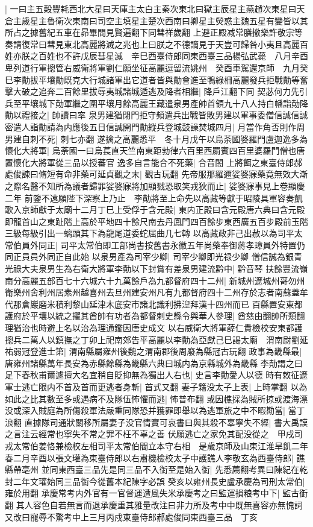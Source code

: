 |{
	一曰主五糓豐耗西北大星曰天庫主太白主秦次東北曰獄主辰星主燕趙次東星曰天倉主歲星主魯衛次東南曰司空主填星主楚次西南曰卿星主熒惑主魏五星有變皆以其所占之據舊紀五車在昴畢間見賢遍翻下同彗祥歲翻}
上避正殿减常膳撤樂許敬宗等奏請復常曰彗見東北高麗將滅之兆也上曰朕之不德謫見于天豈可歸咎小夷且高麗百姓亦朕之百姓也不許戊辰彗星滅　辛巳西臺侍郎同東西臺三品楊弘武薨　八月辛酉卑列道行軍摠管右威衛將軍劉仁願坐征高麗逗留流姚州　癸酉車駕還京師　九月癸巳李勣拔平壤勣既克大行城諸軍出它道者皆與勣會進至鴨綠柵高麗發兵拒戰勣等奮擊大破之追奔二百餘里拔辱夷城諸城遁逃及降者相繼|{
	降戶江翻下同}
契苾何力先引兵至平壤城下勣軍繼之圍平壤月餘高麗王藏遣泉男產帥首領九十八人持白幡詣勣降勣以禮接之|{
	帥讀曰率}
泉男建猶閉門拒守頻遣兵出戰皆敗男建以軍事委僧信誠信誠密遣人詣勣請為内應後五日信誠開門勣縱兵登城鼓譟焚城四月|{
	月當作角否則作周}
男建自刺不死|{
	刺七亦翻}
遂擒之高麗悉平　冬十月戊午以烏荼國婆羅門盧迦逸多為懷化大將軍|{
	烏荼國一曰烏萇直天竺南東距勃律六百里西罽賓四百里婆羅門僧也唐置懷化大將軍從三品以授蕃官}
逸多自言能合不死藥|{
	合音閤}
上將餌之東臺侍郎郝處俊諫曰脩短有命非藥可延貞觀之末|{
	觀古玩翻}
先帝服那羅邇娑婆寐藥竟無效大漸之際名醫不知所為議者歸罪娑婆寐將加顯戮恐取笑戎狄而止|{
	娑婆寐事見上卷顯慶二年}
前鑒不遠願陛下深察上乃止　李勣將至上命先以高藏等獻于昭陵具軍容奏凱歌入京師獻于太廟十二月丁巳上受俘于含元殿|{
	東内正殿曰含元殿唐六典曰含元殿即龍首山之東趾階上高於平地四十餘尺南去丹鳳門四百餘步東西廣五百步殿前玉階三級每級引出一螭頭其下為龍尾道委蛇屈曲几七轉}
以高藏政非己出赦以為司平太常伯員外同正|{
	司平太常伯即工部尚書按舊書永徽五年尚藥奉御蔣孝璋員外特置仍同正員員外同正自此始}
以泉男產為司宰少卿|{
	司宰少卿即光禄少卿}
僧信誠為銀青光祿大夫泉男生為右衛大將軍李勣以下封賞有差泉男建流黔中|{
	黔音琴}
扶餘豐流嶺南分高麗五部百七十六城六十九萬餘戶為九都督府四十二州|{
	新城州遼城州哥勿州衛樂州舍利州居素州越喜州去旦州建安州凡有九都督府四十二州存於志者南蘇蓋牟代那倉巖磨米積利黎山延津木底安市諸北識利拂湼拜漢十四州而已}
百縣置安東都護府於平壤以統之擢其酋帥有功者為都督刺史縣令與華人參理|{
	酋慈由翻帥所類翻理猶治也時避上名以治為理通鑑因唐史成文}
以右威衛大將軍薛仁貴檢校安東都護摠兵二萬人以鎮撫之丁卯上祀南郊告平高麗以李勣為亞獻己巳謁太廟　渭南尉劉延祐弱冠登進士第|{
	渭南縣屬雍州後魏之渭南郡後周廢為縣冠古玩翻}
政事為畿縣最|{
	唐雍州諸縣萬年長安為赤縣餘縣為畿縣六典曰城内為京縣城外為畿縣}
李勣謂之曰足下春秋甫爾遽擅大名宜稍自貶抑無為獨出人右也|{
	史言李勣愛人以德}
時有敇征遼軍士逃亡限内不首及首而更逃者身斬|{
	首式又翻}
妻子籍没太子上表|{
	上時掌翻}
以為如此之比其數至多或遇病不及隊伍怖懼而逃|{
	怖普布翻}
或因樵採為賊所掠或渡海漂没或深入賊庭為所傷殺軍法嚴重同隊恐并獲罪即舉以為逃軍旅之中不暇勘當|{
	當丁浪翻}
直據隊司通狀關移所屬妻子没官情實可哀書曰與其殺不辜寧失不經|{
	書大禹謨之言注云經常也寧失不常之罪不枉不辜之善}
伏願逃亡之家免其配没從之　甲戌司戎太常伯姜恪兼檢校左相司平太常伯閻立本守右相　是歲京師及山東江淮旱飢二年春二月辛酉以張文瓘為東臺侍郎以右肅機檢校太子中護譙人李敬玄為西臺侍郎|{
	譙縣帶亳州}
並同東西臺三品先是同三品不入衘至是始入衘|{
	先悉薦翻考異曰陳紀在乾封二年文瓘始同三品衘今從舊本紀陳字必誤}
癸亥以雍州長史盧承慶為司刑太常伯|{
	雍於用翻}
承慶常考内外官有一官督運遭風失米承慶考之曰監運損粮考中下|{
	監古衘翻}
其人容色自若無言而退承慶重其雅量改注曰非力所及考中中既無喜容亦無愧詞又改曰寵辱不驚考中上三月丙戍東臺侍郎郝處俊同東西臺三品　丁亥

